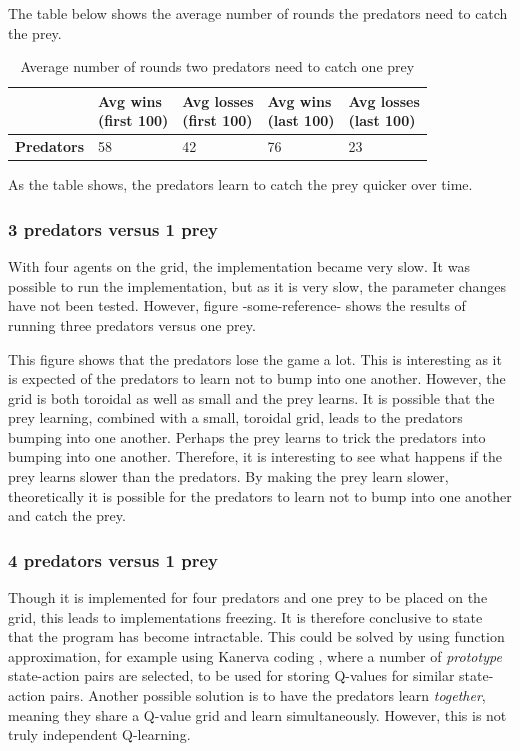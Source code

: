 The table below shows the average number of rounds the predators need to catch the prey.

\begin{table}[H]
\begin{center}
\begin{tabular}{| l | l | l | l | l |}
\hline
 & \parbox{2cm}{\textbf{Avg wins \\ (first 100)}} & \parbox{2cm}{\textbf{Avg losses \\ (first 100)}} & \parbox{2cm}{\textbf{Avg wins \\ (last 100)}} & \parbox{2cm}{\textbf{Avg losses \\ (last 100)}} \\
\hline
\textbf{Predators} & 58 & 42 & 76 & 23 \\
\hline
\end{tabular}
\caption{Average number of rounds two predators need to catch one prey}
\end{center}
\end{table}

As the table shows, the predators learn to catch the prey quicker over time.

\subsubsection{3 predators versus 1 prey}
With four agents on the grid, the implementation became very slow. It was possible to run the implementation, but as it is very slow, the parameter changes have not been tested. However, figure -some-reference- shows the results of running three predators versus one prey.

This figure shows that the predators lose the game a lot. This is interesting as it is expected of the predators to learn not to bump into one another. However, the grid is both toroidal as well as small and the prey learns. It is possible that the prey learning, combined with a small, toroidal grid, leads to the predators bumping into one another. Perhaps the prey learns to trick the predators into bumping into one another. Therefore, it is interesting to see what happens if the prey learns slower than the predators. By making the prey learn slower, theoretically it is possible for the predators to learn not to bump into one another and catch the prey. 

\subsubsection{4 predators versus 1 prey}
Though it is implemented for four predators and one prey to be placed on the grid, this leads to implementations freezing. It is therefore conclusive to state that the program has become intractable. This could be solved by using function approximation, for example using Kanerva coding \cite{wu2009function}, where a number of \textit{prototype} state-action pairs are selected, to be used for storing Q-values for similar state-action pairs. Another possible solution is to have the predators learn \textit{together}, meaning they share a Q-value grid and learn simultaneously. However, this is not truly independent Q-learning. 

